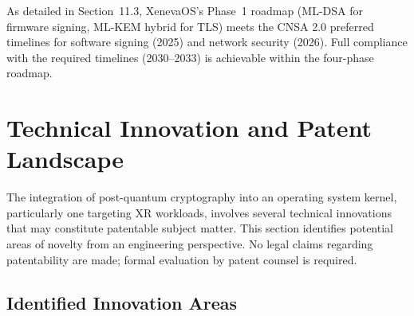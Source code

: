 \documentclass[11pt, a4paper]{article}
\begin{document}
As detailed in Section~11.3, XenevaOS's Phase~1 roadmap (ML-DSA for firmware signing, ML-KEM hybrid for TLS) meets the CNSA 2.0 preferred timelines for software signing (2025) and network security (2026). Full compliance with the required timelines (2030--2033) is achievable within the four-phase roadmap.



\section{Technical Innovation and Patent Landscape}\label{sec:patents}

The integration of post-quantum cryptography into an operating system kernel, particularly one targeting XR workloads, involves several technical innovations that may constitute patentable subject matter. This section identifies potential areas of novelty from an engineering perspective. No legal claims regarding patentability are made; formal evaluation by patent counsel is required.

\subsection{Identified Innovation Areas}\label{sec:patent-areas}
\end{document}
